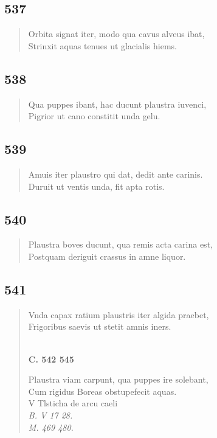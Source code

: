 \documentclass[11pt, a4paper]{report}
\begin{document}
            \subsection*{537}
      \begin{verse}
      Orbita signat iter, modo qua cavus alveus ibat, \\ Strinxit aquas tenues ut glacialis hiems. \\ 
      \end{verse}
  
            \subsection*{538}
      \begin{verse}
      Qua puppes ibant, hac ducunt plaustra iuvenci, \\ Pigrior ut cano constitit unda gelu. \\ 
      \end{verse}
  
            \subsection*{539}
      \begin{verse}
      Amuis iter plaustro qui dat, dedit ante carinis. \\ Duruit ut ventis unda, fit apta rotis. \\ 
      \end{verse}
  
            \subsection*{540}
      \begin{verse}
      Plaustra boves ducunt, qua remis acta carina est, \\ Postquam deriguit crassus in amne liquor. \\ 
      \end{verse}
  
            \subsection*{541}
      \begin{verse}
      Vnda capax ratium plaustris iter algida praebet, \\ Frigoribus saevis ut stetit amnis iners. \\ 
        ﻿\pagebreak 
     \marginpar{[69]} \begin{center} \textbf{C. 542 545} \end{center}Plaustra viam carpunt, qua puppes ire solebant, \\ Cum rigidus Boreas obstupefecit aquas. \\ V Tlsticha de arcu caeli \\ \textit{B. V 17 28.} \\ \textit{M. 469 480.} \\ 
      \end{verse}
  
\end{document}
